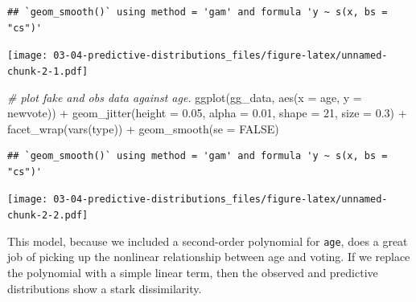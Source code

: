 \documentclass[
]{book}
\newenvironment{Shaded}{\begin{snugshade}}{\end{snugshade}}
\newcommand{\AttributeTok}[1]{\textcolor[rgb]{0.77,0.63,0.00}{#1}}
\newcommand{\CommentTok}[1]{\textcolor[rgb]{0.56,0.35,0.01}{\textit{#1}}}
\newcommand{\ConstantTok}[1]{\textcolor[rgb]{0.00,0.00,0.00}{#1}}
\newcommand{\DecValTok}[1]{\textcolor[rgb]{0.00,0.00,0.81}{#1}}
\newcommand{\FloatTok}[1]{\textcolor[rgb]{0.00,0.00,0.81}{#1}}
\newcommand{\FunctionTok}[1]{\textcolor[rgb]{0.00,0.00,0.00}{#1}}
\newcommand{\NormalTok}[1]{#1}
\newcommand{\SpecialCharTok}[1]{\textcolor[rgb]{0.00,0.00,0.00}{#1}}
\begin{document}
\begin{verbatim}
## `geom_smooth()` using method = 'gam' and formula 'y ~ s(x, bs = "cs")'
\end{verbatim}

\texttt{[image: 03-04-predictive-distributions\_files/figure-latex/unnamed-chunk-2-1.pdf]}

\begin{Shaded}
\begin{Highlighting}[]
\CommentTok{\# plot fake and obs data against age.}
\FunctionTok{ggplot}\NormalTok{(gg\_data, }\FunctionTok{aes}\NormalTok{(}\AttributeTok{x =}\NormalTok{ age, }\AttributeTok{y =}\NormalTok{ newvote)) }\SpecialCharTok{+} 
  \FunctionTok{geom\_jitter}\NormalTok{(}\AttributeTok{height =} \FloatTok{0.05}\NormalTok{, }\AttributeTok{alpha =} \FloatTok{0.01}\NormalTok{, }\AttributeTok{shape =} \DecValTok{21}\NormalTok{, }\AttributeTok{size =} \FloatTok{0.3}\NormalTok{) }\SpecialCharTok{+} 
  \FunctionTok{facet\_wrap}\NormalTok{(}\FunctionTok{vars}\NormalTok{(type)) }\SpecialCharTok{+} 
  \FunctionTok{geom\_smooth}\NormalTok{(}\AttributeTok{se =} \ConstantTok{FALSE}\NormalTok{)}
\end{Highlighting}
\end{Shaded}

\begin{verbatim}
## `geom_smooth()` using method = 'gam' and formula 'y ~ s(x, bs = "cs")'
\end{verbatim}

\texttt{[image: 03-04-predictive-distributions\_files/figure-latex/unnamed-chunk-2-2.pdf]}

This model, because we included a second-order polynomial for
\texttt{age}, does a great job of picking up the nonlinear relationship
between age and voting. If we replace the polynomial with a simple
linear term, then the observed and predictive distributions show a stark
dissimilarity.
\end{document}

